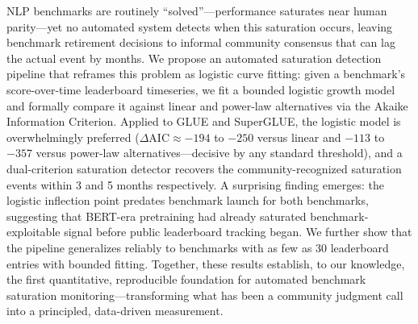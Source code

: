NLP benchmarks are routinely ``solved''---performance saturates near human parity---yet no automated system detects when this saturation occurs, leaving benchmark retirement decisions to informal community consensus that can lag the actual event by months.
We propose an automated saturation detection pipeline that reframes this problem as logistic curve fitting: given a benchmark's score-over-time leaderboard timeseries, we fit a bounded logistic growth model and formally compare it against linear and power-law alternatives via the Akaike Information Criterion.
Applied to GLUE and SuperGLUE, the logistic model is overwhelmingly preferred ($\Delta\text{AIC} \approx -194$ to $-250$ versus linear and $-113$ to $-357$ versus power-law alternatives---decisive by any standard threshold), and a dual-criterion saturation detector recovers the community-recognized saturation events within 3 and 5 months respectively.
A surprising finding emerges: the logistic inflection point predates benchmark launch for both benchmarks, suggesting that BERT-era pretraining had already saturated benchmark-exploitable signal before public leaderboard tracking began.
We further show that the pipeline generalizes reliably to benchmarks with as few as 30 leaderboard entries with bounded fitting.
Together, these results establish, to our knowledge, the first quantitative, reproducible foundation for automated benchmark saturation monitoring---transforming what has been a community judgment call into a principled, data-driven measurement.
